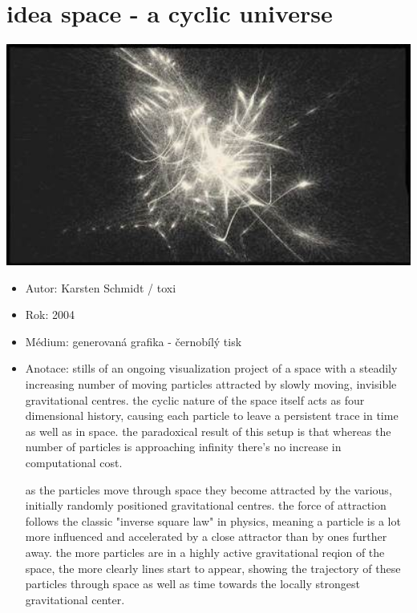 \documentclass[10pt,twopage]{book}
\newcommand{\oddil}[1]{\section{#1}\label{sec:#1}}
\begin{document}

\oddil{idea space - a cyclic universe}


\begin{center}
\includegraphics[width = 1\textwidth]{imgs/ideaspace1.jpg}
\end{center}

\begin{itemize}
\item
Autor: Karsten Schmidt / toxi
\item
Rok: 2004
\item
Médium: generovaná grafika - černobílý tisk
\item
Anotace:
stills of an ongoing visualization project of a space with a steadily increasing number of moving particles attracted by slowly moving, invisible gravitational centres. the cyclic nature of the space itself acts as four dimensional history, causing each particle to leave a persistent trace in time as well as in space. the paradoxical result of this setup is that whereas the number of particles is approaching infinity there's no increase in computational cost.

as the particles move through space they become attracted by the various, initially randomly positioned gravitational centres. the force of attraction follows the classic "inverse square law" in physics, meaning a particle is a lot more influenced and accelerated by a close attractor than by ones further away. the more particles are in a highly active gravitational reqion of the space, the more clearly lines start to appear, showing the trajectory of these particles through space as well as time towards the locally strongest gravitational center.

\end{itemize}
\end{document}
